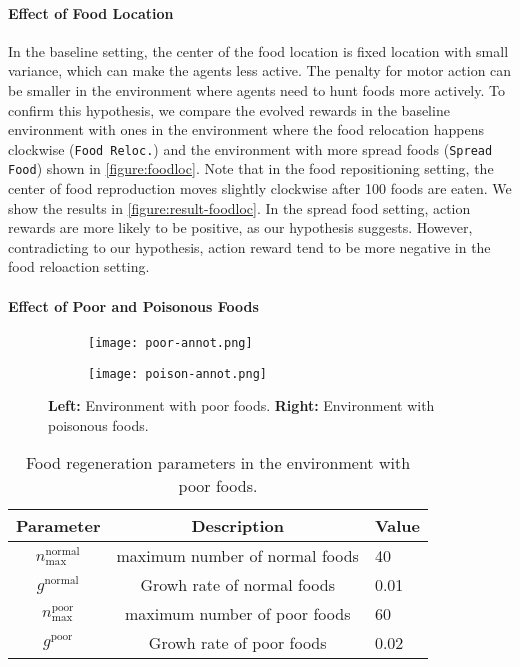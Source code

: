 \paragraph{Effect of Food Location}
In the baseline setting, the center of the food location is fixed location with small variance, which can make the agents less active. The penalty for motor action can be smaller in the environment where agents need to hunt foods more actively. To confirm this hypothesis, we compare the evolved rewards in the baseline environment with ones in the environment where the food relocation happens clockwise (\texttt{Food Reloc.}) and the environment with more spread foods (\texttt{Spread Food}) shown in \cref{figure:foodloc}. Note that in the food repositioning setting, the center of food reproduction moves slightly clockwise after 100 foods are eaten. We show the results in \cref{figure:result-foodloc}. In the spread food setting, action rewards are more likely to be positive, as our hypothesis suggests. However, contradicting to our hypothesis, action reward tend to be more negative in the food reloaction setting.

\paragraph{Effect of Poor and Poisonous Foods}

\begin{figure}[t]
  \begin{subfigure}[t]{4cm}
    \centering
    \texttt{[image: poor-annot.png]}
  \end{subfigure}
  \begin{subfigure}[t]{4cm}
    \centering
    \texttt{[image: poison-annot.png]}
  \end{subfigure}
  \caption{
    \textbf{Left:} Environment with poor foods.
    \textbf{Right:} Environment with poisonous foods.
  }\label{figure:pp}
\end{figure}

\begin{table}[t]
  \begin{tabular}{ccl}
    \toprule
    Parameter & Description & Value \\
    \midrule
    $n_{\textrm{max}}^{\textrm{normal}}$ & maximum number of normal foods & 40\\
    $g^{\textrm{normal}}$ & Growh rate of normal foods & 0.01 \\
    $n_{\textrm{max}}^{\textrm{poor}}$ & maximum number of poor foods & 60 \\
    $g^{\textrm{poor}}$ & Growh rate of poor foods & 0.02 \\
    \bottomrule
  \end{tabular}
  \caption{Food regeneration parameters in the environment with poor foods.}\label{table:poor}
\end{table}

